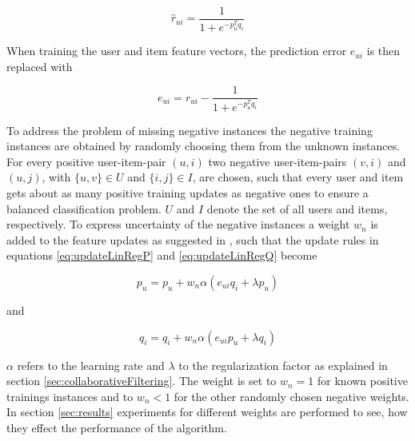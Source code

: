 \documentclass[10pt]{reportMaster}
\begin{document}
\begin{equation}
	\hat{r}_{ui} = \frac{1}{1 + e^{-p_u^Tq_i}}
\end{equation}

When training the user and item feature vectors, the prediction error $e_{ui}$ is then replaced with 

\begin{equation}
	e_{ui} = r_{ui} - \frac{1}{1 + e^{-p_u^Tq_i}}
\end{equation}


To address the problem of missing negative instances the negative training instances are obtained by randomly choosing them from the unknown instances.
For every positive user-item-pair $(u, i)$ two negative user-item-pairs $(v, i)$ and $(u,j)$, with $\{u, v\} \in U$ and $\{i, j\} \in I$, are chosen, such that every user and item gets about as many positive training updates as negative ones to ensure a balanced classification problem.
$U$ and $I$ denote the set of all users and items, respectively.
To express uncertainty of the negative instances a weight $w_n$ is added to the feature updates as suggested in \cite{occf}, such that the update rules in equations \ref{eq:updateLinRegP} and \ref{eq:updateLinRegQ} become 

\begin{equation}
\label{eq:updateLogRegP}
	p_u = p_u + w_n \alpha (e_{ui} q_i + \lambda p_u)
\end{equation}

and 

\begin{equation}
\label{eq:updateLogRegQ}
	q_i = q_i + w_n \alpha (e_{ui} p_u + \lambda q_i)
\end{equation}

$\alpha$ refers to the learning rate and $\lambda$ to the regularization factor as explained in section \ref{sec:collaborativeFiltering}.
The weight is set to $w_n = 1$ for known positive trainings instances and to $w_n < 1$ for the other randomly chosen negative weights.
In section \ref{sec:results} experiments for different weights are performed to see, how they effect the performance of the algorithm.
\end{document}
